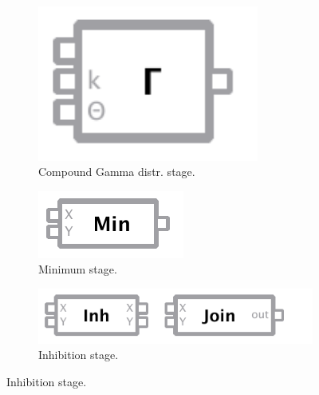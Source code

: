 \begin{figure}[!ht]
 \begin{subfigure}[c]{0.2\textwidth}
   \centering
 	\includegraphics[width=0.8\textwidth]{fig/guigammacp.pdf}
 	\caption{Compound Gamma distr. stage.} \label{fig:itemgammacp}
 \end{subfigure}\hfill
 \begin{subfigure}[c]{0.2\textwidth}
   \centering
 	\includegraphics[width=\textwidth]{fig/guimin.pdf}
 	\caption{Minimum stage.} \label{fig:itemmin}
 \end{subfigure}\hfill
 \begin{subfigure}[c]{0.45\textwidth}
   \centering
 	\includegraphics[width=\textwidth]{fig/guiinh.pdf}
 	\caption{Inhibition stage.} \label{fig:iteminh}
 \end{subfigure}
 

\end{figure}
